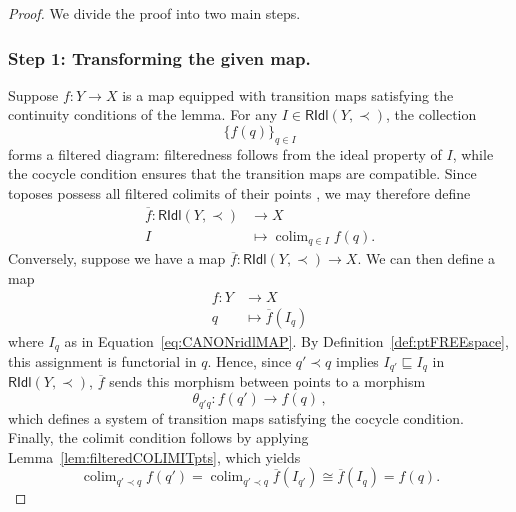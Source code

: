 \documentclass[a4paper, 11pt,reqno]{amsart}
\newcommand{\Set}{\mathrm{Set}}
\newcommand{\baseS}{\mathcal{S}}
\newcommand{\RIdl}{\mathsf{RIdl}}
\DeclareMathOperator*{\colim}{colim}
\begin{document}
\begin{proof} We divide the proof into two main steps.
	\subsubsection*{Step 1: Transforming the given map.} Suppose $f\colon Y\!\longrightarrow X$ is a map equipped with transition maps satisfying the continuity conditions of the lemma. For any $I\in\RIdl(Y,\prec)$, the collection \[ \{f(q)\}_{q\in I} \] forms a filtered diagram: filteredness follows from the ideal property of $I$, while the cocycle condition ensures that the transition maps are compatible. Since toposes possess all filtered colimits of their points %
	 \cite[Corollary 7.14]{J0}, we may therefore define
	\begin{align}\label{eq:GET[0,1]}
	\overline{f}\colon\RIdl(Y,\prec)&\longrightarrow X\\
	I&\longmapsto \displaystyle\colim_{q\in I}f(q).\nonumber
	\end{align}
	Conversely, suppose we have a map $\overline{f}\colon \RIdl(Y,\prec)\rightarrow X$. We can then define a map
	\begin{align}\label{eq:GETqint}
	f\colon Y&\longrightarrow X\\
	q&\longmapsto \overline{f}(I_q) \nonumber
	\end{align}
	where $I_q$ as in Equation~\eqref{eq:CANONridlMAP}. By Definition~\ref{def:ptFREEspace}, this assignment is functorial in $q$. Hence, since $q'\prec q$ implies $I_{q'}\sqsubseteq I_{q}$ in $\RIdl(Y,\prec)$, $\overline{f}$ sends this morphism between points to a morphism
	$$
	\theta_{q'q}\colon
	f(q')
	\longrightarrow
	f(q)\,,
	$$
	which defines a system of transition maps satisfying the cocycle condition. Finally, the colimit condition follows by applying Lemma~\ref{lem:filteredCOLIMITpts}, which yields
	\[\colim_{q'\prec q}f(q')=\colim_{q'\prec q}\overline{f}(I_{q'})\cong \overline{f}(I_q)=f(q).\]
	
	

\end{proof}
\end{document}
